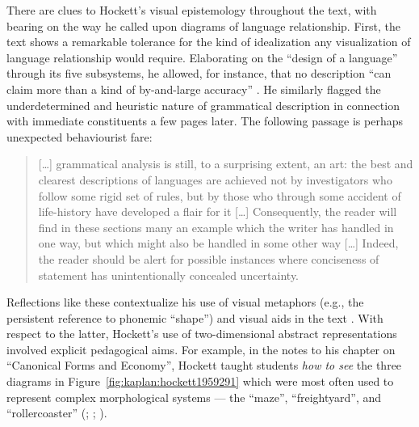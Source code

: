\documentclass[output=paper]{langscibook}
\begin{document}
There are clues to Hockett's visual epistemology throughout the text, with bearing on the way he called upon diagrams of language relationship. First, the text shows a remarkable tolerance for the kind of idealization any visualization of language relationship would require. Elaborating on the ``design of a language'' through its five subsystems, he allowed, for instance, that no description ``can claim more than a kind of by-and-large accuracy'' \citep[139]{Hockett19591958}. He similarly flagged the underdetermined and heuristic nature of grammatical description in connection with immediate constituents a few pages later. The following passage is perhaps unexpected behaviourist fare:

\begin{quotation}
[…] grammatical analysis is still, to a surprising extent, an art: the best and clearest descriptions of languages are achieved not by investigators who follow some rigid set of rules, but by those who through some accident of life-history have developed a flair for it […] Consequently, the reader will find in these sections many an example which the writer has handled in one way, but which might also be handled in some other way […] Indeed, the reader should be alert for possible instances where conciseness of statement has unintentionally concealed uncertainty.  \citep[147]{Hockett19591958}
\end{quotation}

Reflections like these contextualize his use of visual metaphors (e.g., the persistent reference to phonemic ``shape'') and visual aids in the text \citep[130--132]{Hockett19591958}. With respect to the latter, Hockett's use of two-dimensional abstract representations involved explicit pedagogical aims. For example, in the notes to his chapter on ``Canonical Forms and Economy'', Hockett taught students \emph{how to see} the three diagrams in Figure~\ref{fig:kaplan:hockett1959291} which were most often used to represent complex morphological systems — the ``maze'', ``freightyard'', and ``rollercoaster'' (\citealt[290-292]{Hockett19591958}; \citealt{Harris1951}; \citealt{Hoenigswald1950}).
\end{document}

